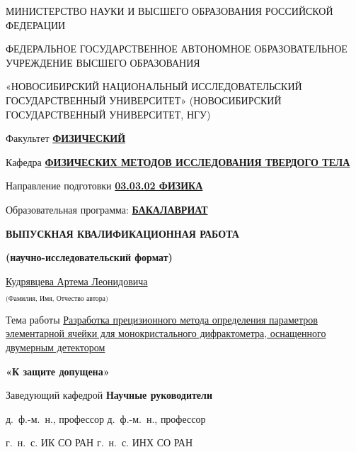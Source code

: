 \begin{titlepage}
\thispagestyle{empty}
\begin{spacing}{1.15}
\footnotesize
\begin{center}
    МИНИСТЕРСТВО НАУКИ И ВЫСШЕГО ОБРАЗОВАНИЯ РОССИЙСКОЙ ФЕДЕРАЦИИ
    \vspace{20pt}

    ФЕДЕРАЛЬНОЕ ГОСУДАРСТВЕННОЕ АВТОНОМНОЕ ОБРАЗОВАТЕЛЬНОЕ\\
    УЧРЕЖДЕНИЕ ВЫСШЕГО ОБРАЗОВАНИЯ
    \vspace{6pt}

    «НОВОСИБИРСКИЙ НАЦИОНАЛЬНЫЙ ИССЛЕДОВАТЕЛЬСКИЙ ГОСУДАРСТВЕННЫЙ УНИВЕРСИТЕТ» (НОВОСИБИРСКИЙ ГОСУДАРСТВЕННЫЙ УНИВЕРСИТЕТ, НГУ)
    \vspace{10pt}
\end{center}
Факультет \uline{\textbf{ФИЗИЧЕСКИЙ}}
\vspace{10pt}

\noindent
Кафедра \uline{\textbf{ФИЗИЧЕСКИХ МЕТОДОВ ИССЛЕДОВАНИЯ ТВЕРДОГО ТЕЛА}}
\vspace{8mm}

\noindent
Направление подготовки \uline{\textbf{03.03.02 ФИЗИКА}}
\vspace{10pt}

\noindent
Образовательная программа: \uline{\textbf{БАКАЛАВРИАТ}}
\vspace{8mm}
\begin{center}
    \textbf{ВЫПУСКНАЯ КВАЛИФИКАЦИОННАЯ РАБОТА}

    \textbf{(научно-исследовательский формат)}
    \vspace{8mm}

    \uline{\hfill Кудрявцева Артема Леонидовича \hfill}

    $_\text{(Фамилия, Имя, Отчество автора)}$
    \vspace{8mm}
\end{center}
Тема работы \uline{Разработка прецизионного метода определения параметров элементарной ячейки для монокри\-стального дифрактометра, оснащенного двумерным детектором \hfill}
\vfill

\noindent
\textbf{«К защите допущена»}

\noindent
Заведующий кафедрой \hfill \textbf{Научные руководители}
\vspace{10pt}

\noindent
д.~ф.-м.~н., профессор \hfill д.~ф.-м.~н., профессор
\vspace{10pt}

\noindent
г.~н.~с. ИК СО РАН \hfill г.~н.~с. ИНХ СО РАН
\vspace{10pt}


\end{spacing}
\end{titlepage}
